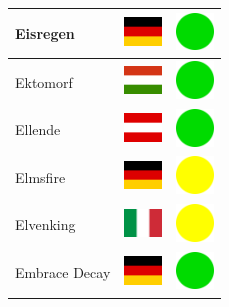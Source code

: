 \documentclass[12pt, a4paper, twoside]{report}
\begin{document}
\begin{center}
\begin{longtable}{|p{5cm}|p{2cm}|p{2cm}|}
Eisregen & \includegraphics[width=1cm]{4x3/de} & \includegraphics[width=1cm]{likes/y} \\ \hline
Ektomorf & \includegraphics[width=1cm]{4x3/hu} & \includegraphics[width=1cm]{likes/y} \\ \hline
Ellende & \includegraphics[width=1cm]{4x3/at} & \includegraphics[width=1cm]{likes/y} \\ \hline
Elmsfire & \includegraphics[width=1cm]{4x3/de} & \includegraphics[width=1cm]{likes/m} \\ \hline
Elvenking & \includegraphics[width=1cm]{4x3/it} & \includegraphics[width=1cm]{likes/m} \\ \hline
Embrace Decay & \includegraphics[width=1cm]{4x3/de} & \includegraphics[width=1cm]{likes/y} \\ \hline

\end{longtable}
\end{center}
\end{document}
